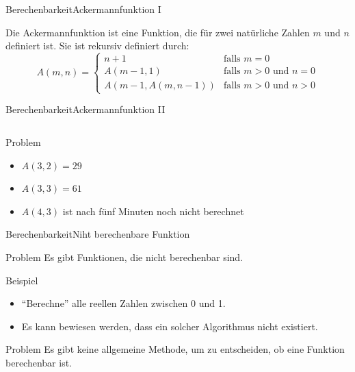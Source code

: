 \documentclass[xelatex,aspectratio=169]{beamer}
\begin{document}
\begin{frame}{Berechenbarkeit}{Ackermannfunktion I}

  \begin{definition}
    Die Ackermannfunktion ist eine Funktion, die für zwei natürliche Zahlen $m$ und $n$ definiert ist. Sie ist rekursiv definiert durch:
    \[
      A\left(m, n\right) = \begin{cases}
        n + 1                                   & \mbox{falls } m = 0                    \\
        A\left(m-1, 1\right)                    & \mbox{falls } m > 0 \mbox{ und } n = 0 \\
        A\left(m-1, A\left(m, n-1\right)\right) & \mbox{falls } m > 0 \mbox{ und } n > 0
      \end{cases}
    \]
  \end{definition}

\end{frame}
\begin{frame}{Berechenbarkeit}{Ackermannfunktion II}

  \inputminted[firstline=8,lastline=16]{python}{src/algorithmus_ackermann.py}

  \begin{alertblock}{Problem}

    \begin{itemize}
      \item $A\left(3, 2\right) = 29$
      \item $A\left(3, 3\right) = 61$
      \item $A\left(4, 3\right)$ ist nach fünf Minuten noch nicht berechnet
    \end{itemize}


  \end{alertblock}
\end{frame}

\begin{frame}{Berechenbarkeit}{Niht berechenbare Funktion}
  \begin{block}{Problem}
    Es gibt Funktionen, die nicht berechenbar sind.
  \end{block}

  \begin{exampleblock}{Beispiel}
    \begin{itemize}
      \item \enquote{Berechne} alle reellen Zahlen zwischen 0 und 1.
      \item Es kann bewiesen werden, dass ein solcher Algorithmus nicht existiert.
    \end{itemize}
  \end{exampleblock}

  \begin{alertblock}{Problem}
    Es gibt keine allgemeine Methode, um zu entscheiden, ob eine Funktion berechenbar ist.
  \end{alertblock}

\end{frame}
\end{document}
